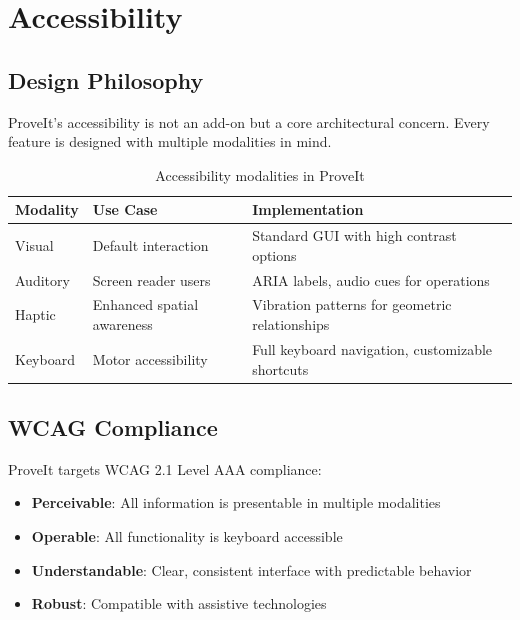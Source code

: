 \documentclass[11pt,a4paper,twoside]{report}
\begin{document}
\chapter{Accessibility}
\label{chap:accessibility}

\section{Design Philosophy}

ProveIt's accessibility is not an add-on but a core architectural concern. Every feature is designed with multiple modalities in mind.

\begin{table}[htbp]
\centering
\caption{Accessibility modalities in ProveIt}
\label{tab:modalities}
\begin{tabular}{@{}p{3cm}p{4cm}p{5cm}@{}}
\toprule
\textbf{Modality} & \textbf{Use Case} & \textbf{Implementation} \\
\midrule
Visual & Default interaction & Standard GUI with high contrast options \\
Auditory & Screen reader users & ARIA labels, audio cues for operations \\
Haptic & Enhanced spatial awareness & Vibration patterns for geometric relationships \\
Keyboard & Motor accessibility & Full keyboard navigation, customizable shortcuts \\
\bottomrule
\end{tabular}
\end{table}

\section{WCAG Compliance}

ProveIt targets WCAG 2.1 Level AAA compliance:

\begin{itemize}[itemsep=5pt]
    \item \textbf{Perceivable}: All information is presentable in multiple modalities
    \item \textbf{Operable}: All functionality is keyboard accessible
    \item \textbf{Understandable}: Clear, consistent interface with predictable behavior
    \item \textbf{Robust}: Compatible with assistive technologies
\end{itemize}
\end{document}
